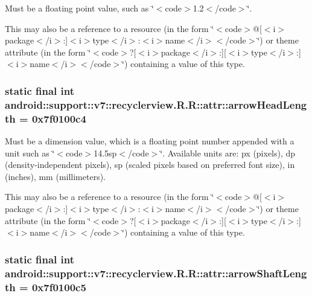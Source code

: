 Must be a floating point value, such as \char`\"{}$<$code$>$1.2$<$/code$>$\char`\"{}. 

This may also be a reference to a resource (in the form \char`\"{}$<$code$>$@\mbox{[}$<$i$>$package$<$/i$>$:\mbox{]}$<$i$>$type$<$/i$>$:$<$i$>$name$<$/i$>$$<$/code$>$\char`\"{}) or theme attribute (in the form \char`\"{}$<$code$>$?\mbox{[}$<$i$>$package$<$/i$>$:\mbox{]}\mbox{[}$<$i$>$type$<$/i$>$:\mbox{]}$<$i$>$name$<$/i$>$$<$/code$>$\char`\"{}) containing a value of this type. \hypertarget{classandroid_1_1support_1_1v7_1_1recyclerview_1_1_r_1_1attr_085d3229d2e139db593dc8298bf70f1d}{
\subsubsection[{arrowHeadLength}]{\setlength{\rightskip}{0pt plus 5cm}static final int android::support::v7::recyclerview.R.R::attr::arrowHeadLength = 0x7f0100c4}}
\label{classandroid_1_1support_1_1v7_1_1recyclerview_1_1_r_1_1attr_085d3229d2e139db593dc8298bf70f1d}


Must be a dimension value, which is a floating point number appended with a unit such as \char`\"{}$<$code$>$14.5sp$<$/code$>$\char`\"{}. Available units are: px (pixels), dp (density-independent pixels), sp (scaled pixels based on preferred font size), in (inches), mm (millimeters). 

This may also be a reference to a resource (in the form \char`\"{}$<$code$>$@\mbox{[}$<$i$>$package$<$/i$>$:\mbox{]}$<$i$>$type$<$/i$>$:$<$i$>$name$<$/i$>$$<$/code$>$\char`\"{}) or theme attribute (in the form \char`\"{}$<$code$>$?\mbox{[}$<$i$>$package$<$/i$>$:\mbox{]}\mbox{[}$<$i$>$type$<$/i$>$:\mbox{]}$<$i$>$name$<$/i$>$$<$/code$>$\char`\"{}) containing a value of this type. \hypertarget{classandroid_1_1support_1_1v7_1_1recyclerview_1_1_r_1_1attr_a3fd168b7e9272159f8573214ea2aa03}{
\subsubsection[{arrowShaftLength}]{\setlength{\rightskip}{0pt plus 5cm}static final int android::support::v7::recyclerview.R.R::attr::arrowShaftLength = 0x7f0100c5}}
\label{classandroid_1_1support_1_1v7_1_1recyclerview_1_1_r_1_1attr_a3fd168b7e9272159f8573214ea2aa03}


